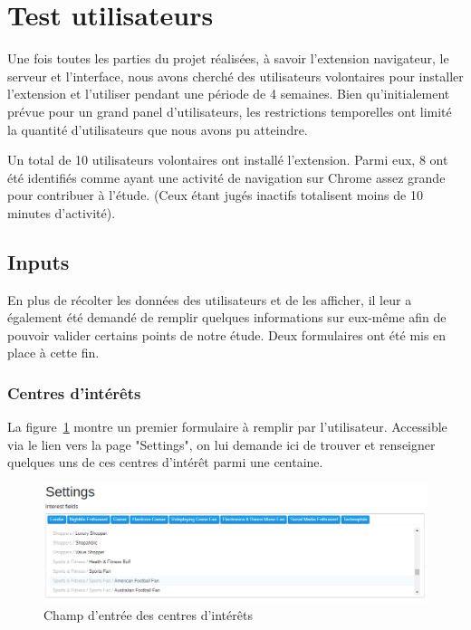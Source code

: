 
\section{Test utilisateurs}

	Une fois toutes les parties du projet réalisées, à savoir l'extension navigateur, le serveur et l'interface, nous avons cherché des utilisateurs volontaires pour installer l'extension et l'utiliser pendant une période de 4 semaines. Bien qu'initialement prévue pour un grand panel d'utilisateurs, les restrictions temporelles ont limité la quantité d'utilisateurs que nous avons pu atteindre.

	Un total de 10 utilisateurs volontaires ont installé l'extension. Parmi eux, 8 ont été identifiés comme ayant une activité de navigation  sur Chrome assez grande pour contribuer à l'étude. (Ceux étant jugés inactifs totalisent moins de 10 minutes d'activité).

	\subsection{Inputs}

		En plus de récolter les données des utilisateurs et de les afficher, il leur a également été demandé de remplir quelques informations sur eux-même afin de pouvoir valider certains points de notre étude. Deux formulaires ont été mis en place à cette fin.

		\subsubsection{Centres d'intérêts}

			La figure~\ref{settings_image} montre un premier formulaire à remplir par l'utilisateur. Accessible via le lien vers la page "Settings", on lui demande ici de trouver et renseigner quelques uns de ces centres d'intérêt parmi une centaine.

			\begin{figure}[!h]
				\centering
				\includegraphics[height=0.32\textwidth]{images/design/pages/settings}
				\caption{Champ d'entrée des centres d'intérêts}
				\label{settings_image}
			\end{figure}


